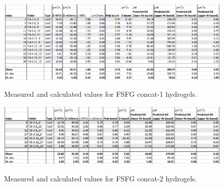 \begin{figure}[t!]
\caption[FSFG concat-1 hydrogel dataset.]{Measured and calculated values for FSFG concat-1 hydrogels.}
\centering
\includegraphics[width=\textwidth]{figs/apps/dataset-cct1.png}
\label{fig:cct1}
\end{figure} 

\begin{figure}[t!]
\caption[FSFG concat-2 hydrogel dataset.]{Measured and calculated values for FSFG concat-2 hydrogels.}
\centering
\includegraphics[width=\textwidth]{figs/apps/dataset-cct2.png}
\label{fig:cct2}
\end{figure} 